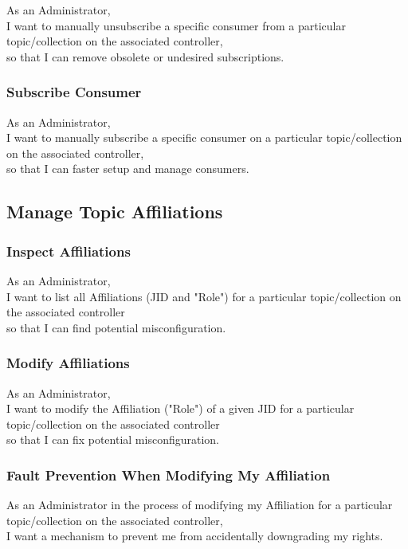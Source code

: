 As an Administrator, \\
I want to manually unsubscribe a specific consumer from a particular topic/collection on the associated controller, \\
so that I can remove obsolete or undesired subscriptions.

\subsubsection{Subscribe Consumer}

As an Administrator, \\
I want to manually subscribe a specific consumer on a particular topic/collection on the associated controller, \\
so that I can faster setup and manage consumers.

\subsection{Manage Topic Affiliations}\label{sec:manage-affiliations}
\subsubsection{Inspect Affiliations}

As an Administrator,\\
I want to list all Affiliations (JID and "Role") for a particular topic/collection on the associated controller \\
so that I can find potential misconfiguration.

\subsubsection{Modify Affiliations}

As an Administrator,\\
I want to modify the Affiliation ("Role") of a given JID for a particular topic/collection on the associated controller \\
so that I can fix potential misconfiguration.

\subsubsection{Fault Prevention When Modifying My Affiliation}

As an Administrator in the process of modifying my Affiliation for a particular topic/collection on the associated controller,\\
I want a mechanism to prevent me from accidentally downgrading my rights.

